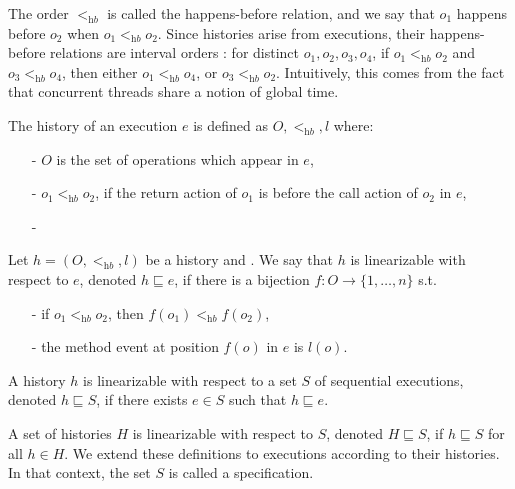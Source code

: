 The order $<_{\textit{hb}}$ is called the happens-before relation, and we say that $o_1$ happens before $o_2$ when $o_1 <_{\textit{hb}} o_2$. Since histories arise from executions, their happens-before relations are interval orders \cite{Bouajjani:2015POPL}: for distinct $o_1,o_2,o_3,o_4$, if $o_1 <_{\textit{hb}} o_2$ and $o_3 <_{\textit{hb}} o_4$, then either $o_1 <_{\textit{hb}} o_4$, or $o_3 <_{\textit{hb}} o_2$. Intuitively, this comes from the fact that concurrent threads share a notion of global time.

The history of an execution $e$ is defined as $O,<_{\textit{hb}},l$ where:

\begin{itemize}
\setlength{\itemsep}{0.5pt}
\item[-] $O$ is the set of operations which appear in $e$,

\item[-] $o_1 <_{\textit{hb}} o_2$, if the return action of $o_1$ is before the call action of $o_2$ in $e$,

\item[-] 
\end{itemize}

\begin{example}\label{example:concurrent execution}
\end{example}

Let $h = (O,<_{\textit{hb}},l)$ be a history and . We say that $h$ is linearizable with respect to $e$, denoted $h \sqsubseteq e$, if there is a bijection $f: O \rightarrow \{ 1,\ldots,n \}$ s.t.

\begin{itemize}
\setlength{\itemsep}{0.5pt}
\item[-] if $o_1 <_{\textit{hb}} o_2$, then $f(o_1) <_{\textit{hb}} f(o_2)$,

\item[-] the method event at position $f(o)$ in $e$ is $l(o)$.
\end{itemize}

\begin{definition}\label{def:linearizability}
A history $h$ is linearizable with respect to a set $S$ of sequential executions, denoted $h \sqsubseteq S$, if there exists $e \in S$ such that $h \sqsubseteq e$.
\end{definition}

A set of histories $H$ is linearizable with respect to $S$, denoted $H \sqsubseteq S$, if $h \sqsubseteq S$ for all $h \in H$. We extend these definitions to executions according to their histories. In that context, the set $S$ is called a specification.
